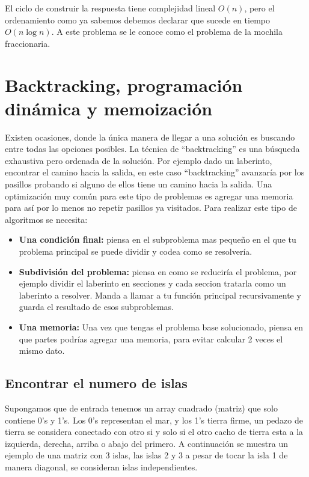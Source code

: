 El ciclo de construir la respuesta tiene complejidad lineal $O(n)$, pero el ordenamiento como ya sabemos debemos declarar que sucede en tiempo $O(n \log n)$. A este problema se le conoce como el problema de la mochila fraccionaria.


\section{Backtracking, programación dinámica y memoización}

Existen ocasiones, donde la única manera de llegar a una solución es buscando entre todas las opciones posibles. La técnica de ``backtracking'' es una búsqueda exhaustiva pero ordenada de la solución. Por ejemplo dado un laberinto, encontrar el camino hacia la salida, en este caso ``backtracking'' avanzaría por los pasillos probando si alguno de ellos tiene un camino hacia la salida. Una optimización muy común para este tipo de problemas es agregar una memoria para así por lo menos no repetir pasillos ya visitados.
Para realizar este tipo de algoritmos se necesita:

\begin{itemize}
    \item \textbf{Una condición final:} piensa en el subproblema mas pequeño en el que tu problema principal se puede dividir y codea como se resolvería.
    \item \textbf{Subdivisión del problema:} piensa en como se reduciría el problema, por ejemplo dividir el laberinto en secciones y cada seccion tratarla como un laberinto a resolver. Manda a llamar a tu función principal recursivamente y guarda el resultado de esos subproblemas.
    \item \textbf{Una memoria:} Una vez que tengas el problema base solucionado, piensa en que partes podrías agregar una memoria, para evitar calcular 2 veces el mismo dato.
\end{itemize}


\subsection{Encontrar el numero de islas}

Supongamos que de entrada tenemos un array cuadrado (matriz) que solo contiene 0's y 1's. Los 0's representan el mar, y los 1's tierra firme, un pedazo de tierra se considera conectado con otro si y solo si el otro cacho de tierra esta a la izquierda, derecha, arriba o abajo del primero. A continuación se muestra un ejemplo de una matriz con 3 islas, las islas 2 y 3 a pesar de tocar la isla 1 de manera diagonal, se consideran islas independientes.


